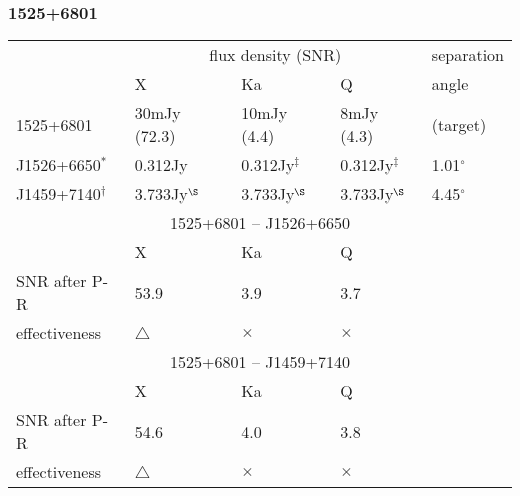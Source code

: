 \subsubsection{
  1525+6801
}
\begin{tabular}{p{30mm}|p{30mm}|p{30mm}|p{30mm}|p{20mm}}
\hline
                 & \multicolumn{3}{c|}{flux density (SNR)}
                 & separation \\
\cline{2-4}
                 & X
                 & Ka
                 & Q
                 & angle \\
\hline
1525+6801        &  30mJy (72.3)
                 &  10mJy (4.4)
                 &   8mJy (4.3)
                 & (target)   \\
\hline
J1526+6650$^*$   &0.312Jy
                 &0.312Jy$^\ddag$
                 &0.312Jy$^\ddag$
                 & 1.01$^\circ$ \\
\hline
J1459+7140$^\dag$&3.733Jy$^\S$
                 &3.733Jy$^\S$
                 &3.733Jy$^\S$
                 & 4.45$^\circ$ \\
\hline
\hline
\multicolumn{5}{c}{1525+6801 -- J1526+6650}    \\
\hline
                 & X
                 & Ka
                 & \multicolumn{2}{l}{Q}       \\
\hline
SNR after P-R    &  53.9
                 &   3.9
                 & \multicolumn{2}{l}{3.7}     \\
\hline
effectiveness    & $\triangle$
                 & $\times$
                 & \multicolumn{2}{l}{$\times$}\\
\hline
\hline
\multicolumn{5}{c}{1525+6801 -- J1459+7140}    \\
\hline
                 & X
                 & Ka
                 & \multicolumn{2}{l}{Q}       \\
\hline
SNR after P-R    &  54.6
                 &   4.0
                 & \multicolumn{2}{l}{3.8}     \\
\hline
effectiveness    & $\triangle$ & $\times$
                 & \multicolumn{2}{l}{$\times$}\\
\hline
\end{tabular}

